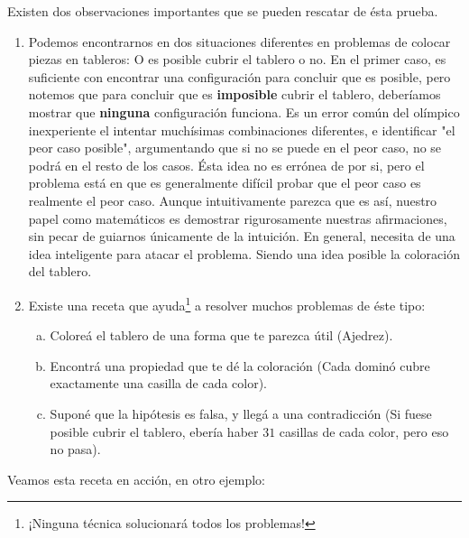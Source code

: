 Existen dos observaciones importantes que se pueden rescatar de \'esta prueba. 
\begin{enumerate}
	\item Podemos encontrarnos en dos situaciones diferentes en problemas de colocar piezas en tableros: O es posible cubrir el tablero o no. En el primer caso, es suficiente con encontrar una configuraci\'on para concluir que es posible, pero notemos que para concluir que es \textbf{imposible} cubrir el tablero, deber\'iamos mostrar que \textbf{ninguna} configuraci\'on funciona. Es un error com\'un del ol\'impico inexperiente el intentar much\'isimas combinaciones diferentes, e identificar "el peor caso posible", argumentando que si no se puede en el peor caso, no se podr\'a en el resto de los casos. \'Esta idea no es err\'onea de por si, pero el problema est\'a en que es generalmente dif\'icil probar que el peor caso es realmente el peor caso. Aunque intuitivamente parezca que es as\'i, nuestro papel como matem\'aticos es demostrar rigurosamente nuestras afirmaciones, sin pecar de guiarnos \'unicamente de la intuici\'on. En general, necesita de una idea inteligente para atacar el problema. Siendo una idea posible la coloraci\'on del tablero.
	\item Existe una receta que ayuda\footnote{¡Ninguna t\'ecnica solucionar\'a todos los problemas!} a resolver muchos problemas de \'este tipo:
	\begin{enumerate}[a.]
		\item Colore\'a el tablero de una forma que te parezca \'util (Ajedrez). %
		\item Encontr\'a una propiedad que te d\'e la coloraci\'on (Cada domin\'o cubre exactamente una casilla de cada color). 
		\item Supon\'e que la hip\'otesis es falsa, y lleg\'a a una contradicci\'on (Si fuese posible cubrir el tablero, eber\'ia haber $31$ casillas de cada color, pero eso no pasa).
	\end{enumerate}

	
	
\end{enumerate}

Veamos esta receta en acci\'on, en otro ejemplo:

